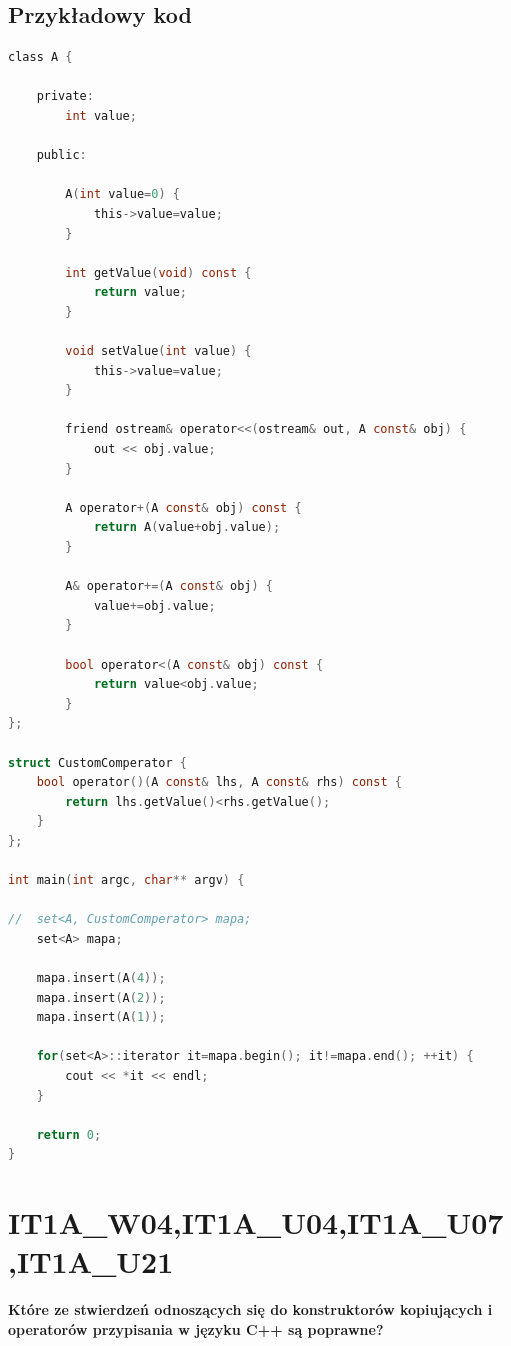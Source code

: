\subsection{Przykładowy kod}
\begin{lstlisting}[language=c]
class A {
	
	private:
		int value;
	
	public:
		
		A(int value=0) {
			this->value=value;
		}
		
		int getValue(void) const {
			return value;
		}
		
		void setValue(int value) {
			this->value=value;
		}
		
		friend ostream& operator<<(ostream& out, A const& obj) {
			out << obj.value;
		}
		
		A operator+(A const& obj) const {
			return A(value+obj.value);
		}
		
		A& operator+=(A const& obj) {
			value+=obj.value;
		}
		
		bool operator<(A const& obj) const {
			return value<obj.value;
		}
};

struct CustomComperator {
	bool operator()(A const& lhs, A const& rhs) const {
		return lhs.getValue()<rhs.getValue();
	}
};

int main(int argc, char** argv) {
	
//	set<A, CustomComperator> mapa;
	set<A> mapa;
	
	mapa.insert(A(4));
	mapa.insert(A(2));
	mapa.insert(A(1));
	
	for(set<A>::iterator it=mapa.begin(); it!=mapa.end(); ++it) {
		cout << *it << endl;
	}
	
	return 0;
}
\end{lstlisting}


\section{IT1A\_W04,IT1A\_U04,IT1A\_U07,IT1A\_U21}
\textbf{Które ze stwierdzeń odnoszących się do konstruktorów kopiujących i operatorów przypisania w języku C++ są poprawne?}

